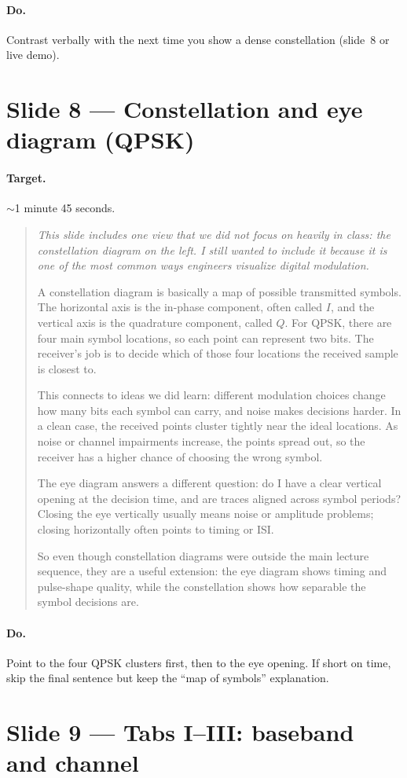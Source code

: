 \documentclass[11pt,a4paper]{article}
\newcommand{\speak}[1]{%
  \begin{quote}\itshape #1\end{quote}%
}
\newcommand{\doitem}[1]{\paragraph{Do.} #1\par\vspace{0.6em}}
\begin{document}
\doitem{Contrast verbally with the next time you show a dense constellation (slide~8 or live demo).}

\section{Slide 8 --- Constellation and eye diagram (QPSK)}

\paragraph{Target.} $\sim$1 minute 45 seconds.

\speak{%
This slide includes one view that we did not focus on heavily in class: the constellation diagram on the left. I still wanted to include it because it is one of the most common ways engineers visualize digital modulation.

A constellation diagram is basically a map of possible transmitted symbols. The horizontal axis is the in-phase component, often called $I$, and the vertical axis is the quadrature component, called $Q$. For QPSK, there are four main symbol locations, so each point can represent two bits. The receiver's job is to decide which of those four locations the received sample is closest to.

This connects to ideas we did learn: different modulation choices change how many bits each symbol can carry, and noise makes decisions harder. In a clean case, the received points cluster tightly near the ideal locations. As noise or channel impairments increase, the points spread out, so the receiver has a higher chance of choosing the wrong symbol.

The eye diagram answers a different question: do I have a clear vertical opening at the decision time, and are traces aligned across symbol periods? Closing the eye vertically usually means noise or amplitude problems; closing horizontally often points to timing or ISI.

So even though constellation diagrams were outside the main lecture sequence, they are a useful extension: the eye diagram shows timing and pulse-shape quality, while the constellation shows how separable the symbol decisions are.%
}

\doitem{Point to the four QPSK clusters first, then to the eye opening. If short on time, skip the final sentence but keep the ``map of symbols'' explanation.}

\section{Slide 9 --- Tabs I--III: baseband and channel}
\end{document}
